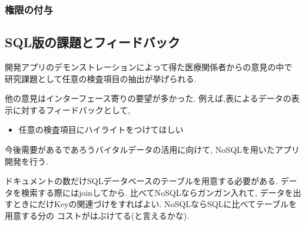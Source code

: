   \subsubsection{権限の付与}


\subsection{SQL版の課題とフィードバック}

  開発アプリのデモンストレーションによって得た医療関係者からの意見の中で
  研究課題として任意の検査項目の抽出が挙げられる.

  他の意見はインターフェース寄りの要望が多かった.
  例えば,表によるデータの表示に対するフィードバックとして,

  \begin{itemize}
    \item 任意の検査項目にハイライトをつけてほしい
  \end{itemize}


  今後需要があるであろうバイタルデータの活用に向けて,
  NoSQLを用いたアプリ開発を行う.

  ドキュメントの数だけSQLデータベースのテーブルを用意する必要がある.
  データを検索する際にはjoinしてから.
  比べてNoSQLならガンガン入れて,
  データを出すときにだけKeyの関連づけをすればよい.
  NoSQLならSQLに比べてテーブルを用意する分の
  コストがはぶけてる(と言えるかな).
